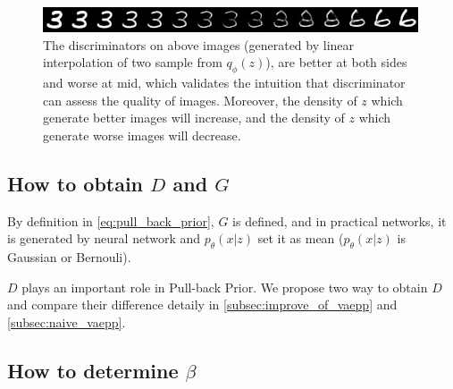 \begin{figure}[tb]
	\centering
	\includegraphics[width=0.9\columnwidth]{../figures/interpolate}
	\caption{
	The discriminators on above images (generated by linear interpolation of two sample from $q_\phi(z)$), are better at both sides and worse at mid, which validates the intuition that discriminator can assess the quality of images. Moreover, the density of $z$ which generate better images will increase, and the density of $z$ which generate worse images will decrease. 
	}
	\label{fig:interpolate}
\end{figure}

\subsection{How to obtain $D$ and $G$}\label{subsec:determine_D_and_G}
By definition in \cref{eq:pull_back_prior}, $G$ is defined, and in practical networks, it is generated by neural network and $p_\theta(x|z)$ set it as mean (\EG $p_\theta(x|z)$ is Gaussian or Bernouli). 

$D$ plays an important role in Pull-back Prior. We propose two way to obtain $D$ and compare their difference detaily in \cref{subsec:improve_of_vaepp} and \cref{subsec:naive_vaepp}. 

\subsection{How to determine $\beta$}\label{subsec:determine_beta}

